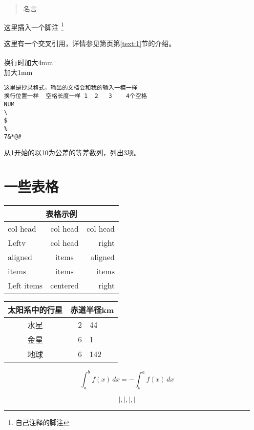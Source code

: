 \documentclass{article}
\begin{document}
\begin{quote}
    名言
\end{quote}

这里插入一个脚注
\footnote{自己注释的脚注}

这里有一个交叉引用\label{text:1}，详情参见第\pageref{text:1}页第\ref{text:1}节的介绍。\\

{\\[4mm]
换行时加大4mm\\[1mm]
加大1mm\\}

\begin{verbatim}
这里是抄录格式，输出的文档会和我的输入一模一样
换行位置一样  空格长度一样 1  2   3    4个空格
NUM
\
$
%
7&*@#

\end{verbatim}

从1开始的以10为公差的等差数列，列出3项。
\newpage
\section{一些表格}

\begin{tabular}{|l|c|r|}
\hline
\multicolumn{3}{|c|}{表格示例}\\
\hline
col head &col head & col head\\
\hline
Leftv & col head & right\\
\cline{1-2}
aligned & items & aligned\\
\cline{2-3}
items&items&items\\\cline{1-2}

Left items& centered & right\\
\hline

\end{tabular}



\par
\begin{tabular}{c r @{.} l}
  \hline
  太阳系中的行星&\multicolumn{2}{c}{赤道半径km}\\
  \hline
  水星&2&44\\
  金星&6&1\\
  地球&6\:378&142\\
  \hline
\end{tabular}




\par
\begin{equation}
  \boxed{\int^{b}_{a}f(x)\,dx=-\int_{b}^{a}f(x)\,dx}
\end{equation}

$$ \big|,\Big|,\bigg|, \Bigg| $$
\end{document}
